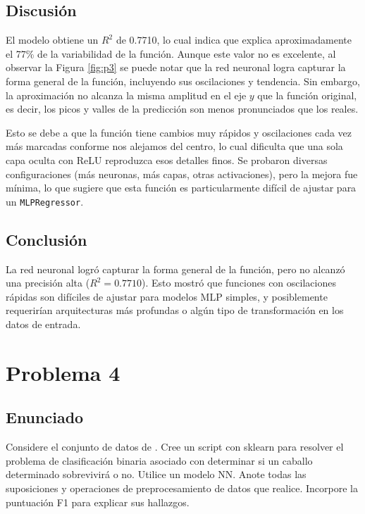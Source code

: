 \documentclass{article}
\begin{document}
\subsection{Discusión}

El modelo obtiene un $R^2$ de 0.7710, lo cual indica que explica aproximadamente el 77\% de la variabilidad de la función. Aunque este valor no es excelente, al observar la Figura \ref{fig:p3} se puede notar que la red neuronal logra capturar la forma general de la función, incluyendo sus oscilaciones y tendencia. Sin embargo, la aproximación no alcanza la misma amplitud en el eje $y$ que la función original, es decir, los picos y valles de la predicción son menos pronunciados que los reales.

Esto se debe a que la función tiene cambios muy rápidos y oscilaciones cada vez más marcadas conforme nos alejamos del centro, lo cual dificulta que una sola capa oculta con ReLU reproduzca esos detalles finos. Se probaron diversas configuraciones (más neuronas, más capas, otras activaciones), pero la mejora fue mínima, lo que sugiere que esta función es particularmente difícil de ajustar para un \texttt{MLPRegressor}.

\subsection{Conclusión}

La red neuronal logró capturar la forma general de la función, pero no alcanzó una precisión alta ($R^2 = 0.7710$). Esto mostró que funciones con oscilaciones rápidas son difíciles de ajustar para modelos MLP simples, y posiblemente requerirían arquitecturas más profundas o algún tipo de transformación en los datos de entrada.

\section{Problema 4}

\subsection{Enunciado}

Considere el conjunto de datos de \cite{KaggleHorseSurvivalData}. Cree un script con sklearn para resolver el problema de clasificación binaria asociado con determinar si un caballo determinado sobrevivirá o no. Utilice un modelo NN. Anote todas las suposiciones y operaciones de preprocesamiento de datos que realice. Incorpore la puntuación F1 para explicar sus hallazgos.
\end{document}

